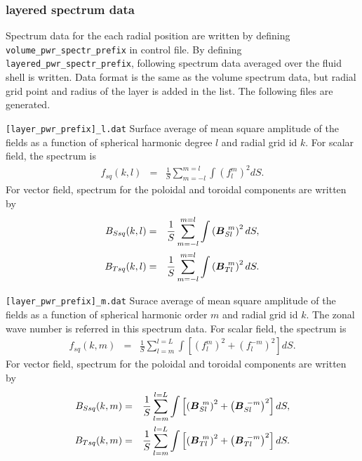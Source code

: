 \subsubsection{layered spectrum data}
Spectrum data for the each radial position are written by defining {\tt volume\_pwr\_spectr\_prefix} in control file. By defining {\tt layered\_pwr\_spectr\_prefix}, following spectrum data averaged over the fluid shell is written. Data format is the same as the volume spectrum data, but radial grid point and radius of the layer is added in the list. The following files are generated.
%
\begin{description}
\item{\tt [layer\_pwr\_prefix]\_l.dat} Surface average of mean square amplitude of the fields as a function of spherical harmonic degree $l$ and radial grid id $k$. For scalar field, the spectrum is
\begin{eqnarray}
f_{sq}(k,l) &=& \frac{1}{S} \sum_{m=-l}^{m=l} \int \left({f_{l}^{m}} \right)^{2} dS.
\nonumber
\end{eqnarray}
For vector field, spectrum for the poloidal and toroidal components are written by 
\begin{eqnarray}
B_{Ssq}(k,l) &=& \frac{1}{S} \sum_{m=-l}^{m=l} \int \left(\mbox{\boldmath$B$}_{Sl}^{\ m} \right)^{2} dS,
\nonumber \\
B_{Tsq}(k,l) &=& \frac{1}{S} \sum_{m=-l}^{m=l} \int \left(\mbox{\boldmath$B$}_{Tl}^{\ m} \right)^{2} dS.
\nonumber
\end{eqnarray}

\item{\tt [layer\_pwr\_prefix]\_m.dat} Surace average of mean square amplitude of the fields as a function of spherical harmonic order $m$ and radial grid id $k$. The zonal wave number is referred in this spectrum data. For scalar field, the spectrum is
\begin{eqnarray}
f_{sq}(k,m) &=& \frac{1}{S} \sum_{l=m}^{l=L} \int \left[ \left(f_{l}^{m} \right)^{2}
 + \left( f_{l}^{-m} \right)^{2} \right] dS.
\nonumber
\end{eqnarray}
For vector field, spectrum for the poloidal and toroidal components are written by 
\begin{eqnarray}
B_{Ssq}(k,m) &=& \frac{1}{S} \sum_{l=m}^{l=L} \int \left[\left(\mbox{\boldmath$B$}_{Sl}^{\ m} \right)^{2} 
 + \left(\mbox{\boldmath$B$}_{Sl}^{\ -m} \right)^{2}  \right] dS,
\nonumber \\
B_{Tsq}(k,m) &=& \frac{1}{S} \sum_{l=m}^{l=L} \int \left[\left(\mbox{\boldmath$B$}_{Tl}^{\ m} \right)^{2} 
 + \left(\mbox{\boldmath$B$}_{Tl}^{\ -m} \right)^{2}  \right] dS.
\nonumber
\end{eqnarray}


\end{description}
